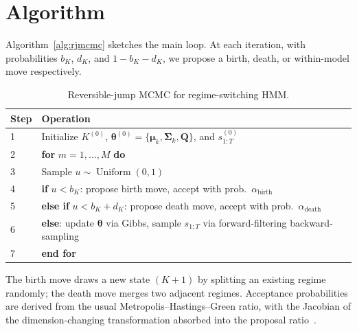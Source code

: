 \section{Algorithm}

Algorithm~\ref{alg:rjmcmc} sketches the main loop. At each iteration, with probabilities $b_K$, $d_K$, and $1-b_K-d_K$, we propose a birth, death, or within-model move respectively.

\begin{table}[H]
\centering
\caption{Reversible-jump MCMC for regime-switching HMM.}
\label{tab:algorithm}
\begin{tabularx}{0.92\textwidth}{@{}l >{\raggedright\arraybackslash}X@{}}
\toprule
\textbf{Step} & \textbf{Operation} \\
\midrule
1 & Initialize $K^{(0)}$, $\boldsymbol{\theta}^{(0)} = \{\boldsymbol{\mu}_k, \boldsymbol{\Sigma}_k, \mathbf{Q}\}$, and $s_{1:T}^{(0)}$ \\{}
2 & \textbf{for} $m = 1,\dots,M$ \textbf{do} \\{}
3 & \quad Sample $u \sim \operatorname{Uniform}(0,1)$ \\{}
4 & \quad \textbf{if} $u < b_K$: propose birth move, accept with prob.\ $\alpha_{\text{birth}}$ \\{}
5 & \quad \textbf{else if} $u < b_K + d_K$: propose death move, accept with prob.\ $\alpha_{\text{death}}$ \\{}
6 & \quad \textbf{else}: update $\boldsymbol{\theta}$ via Gibbs, sample $s_{1:T}$ via forward-filtering backward-sampling \\{}
7 & \textbf{end for} \\
\bottomrule
\end{tabularx}
\end{table}

The birth move draws a new state $(K+1)$ by splitting an existing regime randomly; the death move merges two adjacent regimes. Acceptance probabilities are derived from the usual Metropolis--Hastings--Green ratio, with the Jacobian of the dimension-changing transformation absorbed into the proposal ratio~\cite{green1995}.
